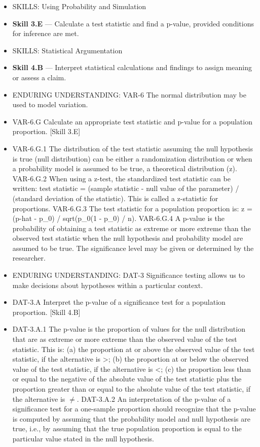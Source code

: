 \documentclass[11pt]{article}
\begin{document}


{\small
\begin{itemize}[leftmargin=1.5em,itemsep=2pt,topsep=2pt]
  \item SKILLS: Using Probability and Simulation
  \item \textbf{Skill 3.E} --- Calculate a test statistic and find a p-value, provided conditions for inference are met.
  \item SKILLS: Statistical Argumentation
  \item \textbf{Skill 4.B} --- Interpret statistical calculations and findings to assign meaning or assess a claim.
  \item ENDURING UNDERSTANDING: VAR-6 The normal distribution may be used to model variation.
  \item VAR-6.G Calculate an appropriate test statistic and p-value for a population proportion. [Skill 3.E]
  \item VAR-6.G.1 The distribution of the test statistic assuming the null hypothesis is true (null distribution) can be either a randomization distribution or when a probability model is assumed to be true, a theoretical distribution (z). VAR-6.G.2 When using a z-test, the standardized test statistic can be written: test statistic = (sample statistic - null value of the parameter) / (standard deviation of the statistic). This is called a z-statistic for proportions. VAR-6.G.3 The test statistic for a population proportion is: z = (p-hat - p\_0) / sqrt(p\_0(1 - p\_0) / n). VAR-6.G.4 A p-value is the probability of obtaining a test statistic as extreme or more extreme than the observed test statistic when the null hypothesis and probability model are assumed to be true. The significance level may be given or determined by the researcher.
  \item ENDURING UNDERSTANDING: DAT-3 Significance testing allows us to make decisions about hypotheses within a particular context.
  \item DAT-3.A Interpret the p-value of a significance test for a population proportion. [Skill 4.B]
  \item DAT-3.A.1 The p-value is the proportion of values for the null distribution that are as extreme or more extreme than the observed value of the test statistic. This is: (a) the proportion at or above the observed value of the test statistic, if the alternative is >; (b) the proportion at or below the observed value of the test statistic, if the alternative is <; (c) the proportion less than or equal to the negative of the absolute value of the test statistic plus the proportion greater than or equal to the absolute value of the test statistic, if the alternative is $\neq$. DAT-3.A.2 An interpretation of the p-value of a significance test for a one-sample proportion should recognize that the p-value is computed by assuming that the probability model and null hypothesis are true, i.e., by assuming that the true population proportion is equal to the particular value stated in the null hypothesis.
\end{itemize}
}
\end{document}
